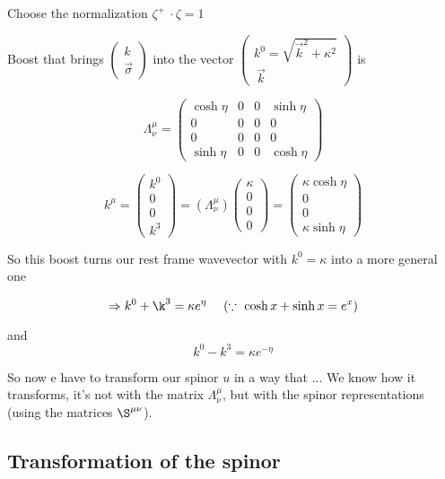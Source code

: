 \documentclass[11pt]{article}
\begin{document}
Choose the normalization $\zeta^+\ \cdot \zeta = 1$

Boost that brings $\begin{pmatrix}
	k\\ \vec{\sigma}
\end{pmatrix}$ into the vector $\begin{pmatrix}
	k^0 = \sqrt{\vec{k}^2 + \kappa^2}\\ \
			\vec{k}
\end{pmatrix}$ is


		\[ \Lambda^\mu_\nu = \begin{pmatrix}
			\cosh \eta & 0 & 0 & \sinh \eta\\
			0 & 0 & 0 & 0 \\
			0 & 0 & 0 & 0\\
			\sinh \eta & 0 & 0 & \cosh \eta
		\end{pmatrix}\]

	$$k^\mu = \begin{pmatrix}
		k^0 \\ 0 \\ 0 \\ k^3
	\end{pmatrix} = (\Lambda^\mu_\nu)\begin{pmatrix}
	\kappa \\ 0 \\ 0 \\ 0
\end{pmatrix} = \begin{pmatrix}
		\kappa \cosh \eta\\ 0 \\ 0 \\ \kappa \sinh \eta
\end{pmatrix}$$

So this boost turns our rest frame wavevector with $k^0 = \kappa$ into a more general one

\[ \Rightarrow k^0 +  \k^3 = \kappa e^\eta\    \quad (\because\ \cosh x + \sinh x = e^{x})\]

and \[ k^0 - k^3 = \kappa e^{-\eta} \]

	So now e have to transform our spinor $u$ in a way that ... We know how it transforms, it's not with the matrix $\Lambda^\mu_\nu$, but with the spinor representations (using the matrices $\S^{\mu\nu}$).
	
	\subsection*{Transformation of the spinor}
	
\end{document}
